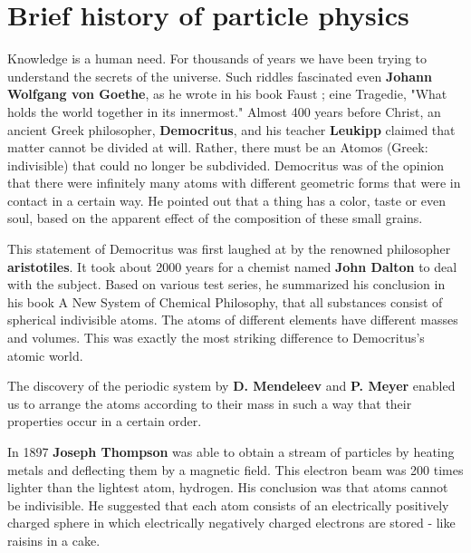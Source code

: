 \section{Brief history of particle physics}
Knowledge is a human need. For thousands of years we have been trying to understand the secrets of the universe. Such riddles fascinated even \textbf{Johann Wolfgang von Goethe}, as he wrote in his book Faust \cite{goethe1921faust}; eine Tragedie, "What holds the world together in its innermost." 
Almost 400 years before Christ, an ancient Greek philosopher, \textbf{Democritus}, and his teacher \textbf{Leukipp} claimed that matter cannot be divided at will. Rather, there must be an Atomos (Greek: indivisible) that could no longer be subdivided.
Democritus was of the opinion that there were infinitely many atoms with different geometric forms that were in contact in a certain way. He pointed out that a thing has a color, taste or even soul, based on the apparent effect of the composition of these small grains.
\cite{capelle1968vorsokratiker}

This statement of Democritus was first laughed at by the renowned philosopher \textbf{aristotiles}. It took about 2000 years for a chemist named \textbf{John Dalton} to deal with the subject. Based on various test series, he summarized his conclusion in his book A New System of Chemical Philosophy, that all substances consist of spherical indivisible atoms. The atoms of different elements have different masses and volumes. This was exactly the most striking difference to Democritus's atomic world.\cite{dalton2010new}

The discovery of the periodic system by \textbf{D. Mendeleev} and \textbf{P. Meyer} enabled us to arrange the atoms according to their mass in such a way that their properties occur in a certain order.\cite{haken2013atom}

In 1897 \textbf{Joseph Thompson} was able to obtain a stream of particles by heating metals and deflecting them by a magnetic field. This electron beam was 200 times lighter than the lightest atom, hydrogen.
His conclusion was that atoms cannot be indivisible. He suggested that each atom consists of an electrically positively charged sphere in which electrically negatively charged electrons are stored - like raisins in a cake.

